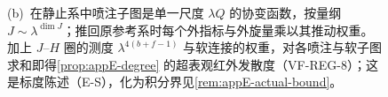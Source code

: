\begin{figure}[htbp]
{(b)~在静止系中喷注子图是单一尺度 $\lambda Q$ 的协变函数，按量纲 $J\sim\lambda^{\dim J}$；推回原参考系时每个外指标与外旋量乘以其推动权重。
加上 $J$--$H$ 圈的测度 $\lambda^{4(b+f-1)}$ 与软连接的权重，对各喷注与软子图求和即得\cref{prop:appE-degree} 的超表观红外发散度（VF-REG-8）；这是标度陈述（E-S），化为积分界见\cref{rem:appE-actual-bound}。}
\label{fig:appE-boost}
\end{figure}
